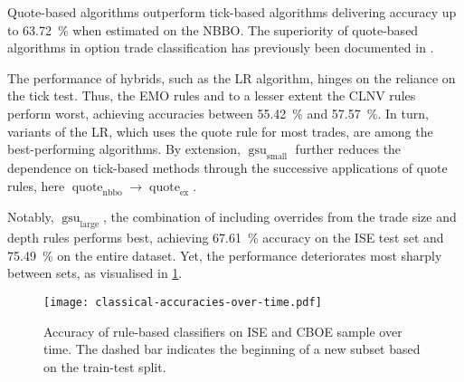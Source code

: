 Quote-based algorithms outperform tick-based algorithms delivering accuracy up to \SI{63.72}{\percent} when estimated on the \gls{NBBO}. The superiority of quote-based algorithms in option trade classification has previously been documented in \textcites[][891]{savickasInferringDirectionOption2003}[][3]{grauerOptionTradeClassification2022}.

The performance of hybrids, such as the \gls{LR} algorithm, hinges on the reliance on the tick test. Thus, the \gls{EMO} rules and to a lesser extent the \gls{CLNV} rules perform worst, achieving accuracies between \SI{55.42}{\percent} and \SI{57.57}{\percent}. In turn, variants of the \gls{LR}, which uses the quote rule for most trades, are among the best-performing algorithms. By extension, $\operatorname{gsu}_{\mathrm{small}}$ further reduces the dependence on tick-based methods through the successive applications of quote rules, here $\operatorname{quote}_{\mathrm{nbbo}} \to \operatorname{quote}_{\mathrm{ex}}$.

Notably, $\operatorname{gsu}_{\mathrm{large}}$, the combination of \textcite[][33]{grauerOptionTradeClassification2022} including overrides from the trade size and depth rules performs best, achieving \SI{67.61}{\percent} accuracy on the \gls{ISE} test set and \SI{75.49}{\percent} on the entire dataset. Yet, the performance deteriorates most sharply between sets, as visualised in \cref{fig:classical-accuracies-over-time}.

\begin{figure}[ht]
    \centering
    \texttt{[image: classical-accuracies-over-time.pdf]}
    \caption[Accuracy Of Rule-Based Classifiers On  and  Over Time]{Accuracy of rule-based classifiers on \gls{ISE} and \gls{CBOE} sample over time. The dashed bar \myline{} indicates the beginning of a new subset based on the train-test split.}
    \label{fig:classical-accuracies-over-time}
\end{figure}

